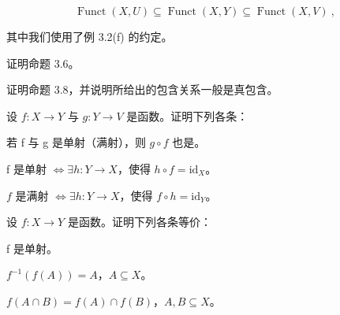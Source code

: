 \begin{proposition}
\begin{subitems}
\begin{equation}
\operatorname{F u n c t}(X,U)\subseteq\operatorname{F u n c t}(X,Y)\subseteq\operatorname{F u n c t}(X,V)~,
\end{equation}

其中我们使用了例 3.2(f) 的约定。

\end{subitems}

\end{proposition}

\exerciseshead

\begin{exercises}
\item

证明命题 3.6。

\item

证明命题 3.8，并说明所给出的包含关系一般是真包含。

\item

设 $f: X \to Y$ 与 $g: Y \to V$ 是函数。证明下列各条：

\begin{items}
\item

若 f 与 g 是单射（满射），则 $ g \circ f $ 也是。

\item

f 是单射 $ \Leftrightarrow \exists h: Y \to X $，使得 $ h \circ f = \mathrm{id}_X $。

\item

$f$ 是满射 $\Longleftrightarrow \exists h: Y \to X$，使得 $f \circ h = \mathrm{id}_{Y}$。

\end{items}

\item

设 $f: X \to Y$ 是函数。证明下列各条等价：

\begin{items}
\item

f 是单射。

\item

$ f^{-1}(f(A)) = A $，$ A \subseteq X $。

\item

$ f(A \cap B) = f(A) \cap f(B) $，$ A, B \subseteq X $。


\end{items}
\end{exercises}
